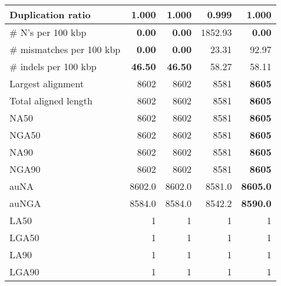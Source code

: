 \documentclass[12pt,a4paper]{article}
\begin{document}
\begin{table}[ht]
\begin{center}
\begin{tabular}{|l*{4}{|r}|}
Duplication ratio & 1.000 & 1.000 & {\bf 0.999} & 1.000 \\ \hline
\# N's per 100 kbp & {\bf 0.00} & {\bf 0.00} & 1852.93 & {\bf 0.00} \\ \hline
\# mismatches per 100 kbp & {\bf 0.00} & {\bf 0.00} & 23.31 & 92.97 \\ \hline
\# indels per 100 kbp & {\bf 46.50} & {\bf 46.50} & 58.27 & 58.11 \\ \hline
Largest alignment & 8602 & 8602 & 8581 & {\bf 8605} \\ \hline
Total aligned length & 8602 & 8602 & 8581 & {\bf 8605} \\ \hline
NA50 & 8602 & 8602 & 8581 & {\bf 8605} \\ \hline
NGA50 & 8602 & 8602 & 8581 & {\bf 8605} \\ \hline
NA90 & 8602 & 8602 & 8581 & {\bf 8605} \\ \hline
NGA90 & 8602 & 8602 & 8581 & {\bf 8605} \\ \hline
auNA & 8602.0 & 8602.0 & 8581.0 & {\bf 8605.0} \\ \hline
auNGA & 8584.0 & 8584.0 & 8542.2 & {\bf 8590.0} \\ \hline
LA50 & 1 & 1 & 1 & 1 \\ \hline
LGA50 & 1 & 1 & 1 & 1 \\ \hline
LA90 & 1 & 1 & 1 & 1 \\ \hline
LGA90 & 1 & 1 & 1 & 1 \\ \hline
\end{tabular}
\end{center}
\end{table}
\end{document}

